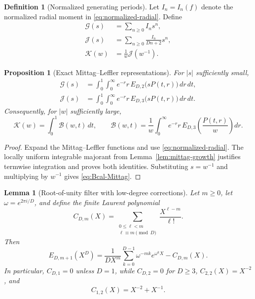 \documentclass[11pt]{article}
\numberwithin{equation}{section}
\newtheorem{proposition}[proposition]{Proposition}
\newtheorem{lemma}[lemma]{Lemma}
\theoremstyle{definition}
\newtheorem{definition}[definition]{Definition}
\theoremstyle{remark}
\newcommand{\Bcal}{\mathcal B}
\newcommand{\Gcal}{\mathcal G}
\newcommand{\Jcal}{\mathcal J}
\newcommand{\Kcal}{\mathcal K}
\begin{document}
\begin{definition}[Normalized generating periods]\label{def:generating-periods}
Let $I_n=I_n(f)$ denote the normalized radial moment in \eqref{eq:normalized-radial}.  Define
\begin{align}
  \Gcal(s)&=\sum_{n\ge0}I_n s^n,\label{eq:Gcal-general}\\
  \Jcal(s)&=\sum_{n\ge0}\frac{I_n}{Dn+2}s^n,\label{eq:Jcal-series-new}\\
  \Kcal(w)&=\frac1w\Jcal(w^{-1}).\label{eq:Kcal-new}
\end{align}
\end{definition}

\begin{proposition}[Exact Mittag--Leffler representations]\label{prop:Mittag-representations}
For $|s|$ sufficiently small,
\begin{align}
  \Gcal(s)
  &=\int_0^1\int_0^\infty
    e^{-r}r\,E_{D,2}\bigl(sP(t,r)\bigr)\,dr\,dt,\label{eq:Gcal-Mittag-general}\\
  \Jcal(s)
  &=\int_0^1\int_0^\infty
    e^{-r}r\,E_{D,3}\bigl(sP(t,r)\bigr)\,dr\,dt.\label{eq:Jcal-Mittag}
\end{align}
Consequently, for $|w|$ sufficiently large,
\begin{equation}\label{eq:Bcal-Mittag}
  \Kcal(w)=\int_0^1\Bcal(w,t)\,dt,
  \qquad
  \Bcal(w,t)=\frac1w\int_0^\infty
  e^{-r}r\,E_{D,3}\!\left(\frac{P(t,r)}w\right)dr.
\end{equation}
\end{proposition}

\begin{proof}
Expand the Mittag--Leffler functions and use
\eqref{eq:normalized-radial}.  The locally uniform integrable majorant
from Lemma~\ref{lem:mittag-growth} justifies termwise integration and proves
both identities.  Substituting $s=w^{-1}$ and multiplying by $w^{-1}$
gives \eqref{eq:Bcal-Mittag}.
\end{proof}


\begin{lemma}[Root-of-unity filter with low-degree corrections]\label{lem:root-filter-general}
Let $m\ge0$, let $\omega=e^{2\pi i/D}$, and define the finite Laurent polynomial
\[
  C_{D,m}(X)
  =\sum_{\substack{0\le \ell<m\\ \ell\equiv m\pmod D}}
   \frac{X^{\ell-m}}{\ell!}.
\]
Then
\begin{equation}\label{eq:root-filter-general}
  E_{D,m+1}(X^D)
  =\frac1{DX^m}\sum_{k=0}^{D-1}
   \omega^{-mk}e^{\omega^kX}-C_{D,m}(X).
\end{equation}
In particular, $C_{D,1}=0$ unless $D=1$, while $C_{D,2}=0$ for $D\ge3$, $C_{2,2}(X)=X^{-2}$, and
\[
  C_{1,2}(X)=X^{-2}+X^{-1}.
\]
\end{lemma}
\end{document}
